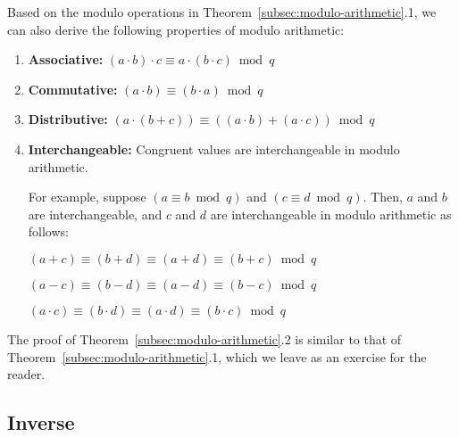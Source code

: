 Based on the modulo operations in Theorem~\ref*{subsec:modulo-arithmetic}.1, we can also derive the following properties of modulo arithmetic:


\begin{tcolorbox}[title={\textbf{\tboxtheorem{\ref*{subsec:modulo-arithmetic}.2} Properties of Modulo Arithmetic}}]

\begin{enumerate}
\item \textbf{Associative:} $(a \cdot b) \cdot c \equiv a \cdot (b \cdot c) \bmod q$

\item \textbf{Commutative:} $(a \cdot b) \equiv (b \cdot a) \bmod q$

\item \textbf{Distributive:} $(a \cdot (b + c)) \equiv ((a \cdot b) + (a \cdot c))  \bmod q$

\item \textbf{Interchangeable:} Congruent values are interchangeable in modulo arithmetic. 

For example, suppose $(a \equiv b \bmod q)$ and $(c \equiv d \bmod q)$. Then, $a$ and $b$ are interchangeable, and $c$ and $d$ are interchangeable in modulo arithmetic as follows:

$(a + c) \equiv (b + d) \equiv (a + d) \equiv (b + c) \bmod q$

$(a - c) \equiv (b - d) \equiv (a - d) \equiv (b - c) \bmod q$

$(a \cdot c) \equiv (b \cdot d) \equiv (a \cdot d) \equiv (b \cdot c) \bmod q$

\end{enumerate}

\end{tcolorbox}

The proof of Theorem~\ref*{subsec:modulo-arithmetic}.2 is similar to that of Theorem~\ref*{subsec:modulo-arithmetic}.1, which we leave as an exercise for the reader. 


\subsection{Inverse}
\label{subsec:modulo-inverse}

